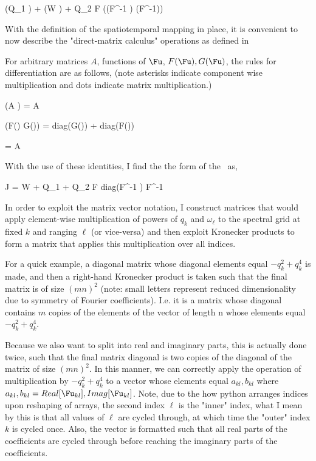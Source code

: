 \beq \label{e-FksMatrix}
(Q_1 \star \Fu) + (W \dot \Fu) + Q_2 \dot F \dot ((F^{-1} \dot \Fu) \star (F^{-1}\dot \Fu))
\eeq

With the definition of the spatiotemporal mapping in place, it is convenient to now describe the "direct-matrix calculus"
operations as defined in 

For arbitrary matrices $A$, functions of $\Fu$, $F(\Fu), G(\Fu)$, the rules for differentiation are as follows,
(note asterisks indicate component wise multiplication and dots indicate matrix multiplication.)

\beq \label{e-DMdiffrules}
\frac{\partial}{\partial \Fu}(A \cdot \Fu) = A
\eeq

\beq
\frac{\partial}{\partial \Fu}(F(\Fu) \ast G(\Fu)) = diag(G(\Fu)) \ast {} + diag(F(\Fu)) \ast {}
\eeq

\beq
\frac{\partial}{\partial \Fu} = A \cdot {}
\eeq


With the use of these identities, I find the the form of the \jacobianM\ as,

\beq
J = W + Q_1 + Q_2 \cdot F \cdot diag(F^{-1} \ast \Fu) \cdot F^{-1}
\eeq

In order to exploit the matrix vector notation, I construct matrices that would apply element-wise multiplication
of powers of $q_k$ and $\omega_\ell$ to the spectral grid at fixed $k$ and ranging $\ell$ (or vice-versa) and then
exploit Kronecker products to form a matrix that applies this multiplication over all indices.

For a quick example, a diagonal matrix whose diagonal elements equal $-q_k^2 + q_k^4$ is made, and then a right-hand
Kronecker product is taken such that the final matrix is of size $(mn)^2$ (note: small letters represent reduced dimensionality
due to symmetry of Fourier coefficients). I.e. it is a matrix whose diagonal contains $m$ copies of the elements of
the vector of length n whose elements equal $-q_k^2 + q_k^4$.

Because we also want to split into real and imaginary parts, this is actually done twice, such that the final matrix diagonal
is two copies of the diagonal of the matrix of size $(mn)^2$. In this manner, we can correctly apply the operation of multiplication
by $-q_k^2 + q_k^4$ to a vector whose elements equal ${a_{kl}, b_{kl}}$ where $a_{kl},b_{kl} = Real[\Fu_{kl}], Imag[\Fu_{kl}]$.
Note, due to the how python arranges indices upon reshaping of arrays, the second index $\ell$ is the "inner" index, what I mean by this
is that all values of $\ell$ are cycled through, at which time the "outer" index $k$ is cycled once. Also, the vector is formatted
such that all real parts of the coefficients are cycled through before reaching the imaginary parts of the coefficients.

